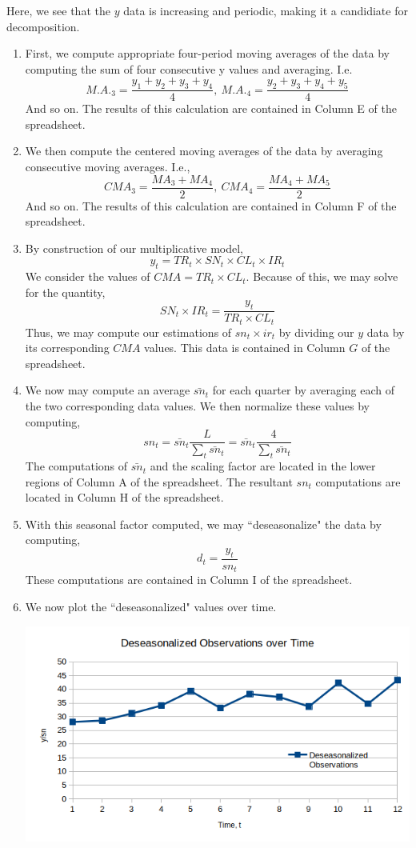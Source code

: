 \documentclass[letterpaper,10pt]{article}
\begin{document}
\begin{enumerate}
\begin{center}
\end{center}
Here, we see that the $y$ data is increasing and periodic, making it a candidiate for decomposition.
\begin{enumerate}
\item First, we compute appropriate four-period moving averages of the data by computing the sum of four consecutive y values and averaging. I.e.
\[M.A._3=\frac{y_1+y_2+y_3+y_4}{4},\ M.A._4=\frac{y_2+y_3+y_4+y_5}{4}\]
And so on. The results of this calculation are contained in Column E of the spreadsheet.
\item We then compute the centered moving averages of the data by averaging consecutive moving averages. I.e.,
\[CMA_3=\frac{MA_3+MA_4}{2},\ CMA_4=\frac{MA_4+MA_5}{2}\]
And so on. The results of this calculation are contained in Column F of the spreadsheet.
\item By construction of our multiplicative model,
\[y_t=TR_t\times SN_t\times CL_t\times IR_t\]
We consider the values of $CMA=TR_t\times CL_t$. Because of this, we may solve for the quantity,
\[SN_t\times IR_t = \frac{y_t}{TR_t\times CL_t}\]
Thus, we may compute our estimations of $sn_t\times ir_t$ by dividing our $y$ data by its corresponding $CMA$ values. This data is contained in Column $G$ of the spreadsheet.
\item We now may compute an average $\bar{sn}_t$ for each quarter by averaging each of the two corresponding data values. We then normalize these values by computing,
\[sn_t=\bar{sn}_t \frac{L}{\sum_t \bar{sn}_t}=\bar{sn}_t \frac{4}{\sum_t \bar{sn}_t}\]
The computations of $\bar{sn}_t$ and the scaling factor are located in the lower regions of Column A of the spreadsheet. The resultant $sn_t$ computations are located in Column H of the spreadsheet.
\item With this seasonal factor computed, we may ``deseasonalize" the data by computing,
\[d_t=\frac{y_t}{sn_t}\]
These computations are contained in Column I of the spreadsheet.
\item We now plot the ``deseasonalized" values over time.
\begin{center}
\includegraphics[scale=.8]{deseasonalizedmult.png}

\end{center}
\end{enumerate}
\end{enumerate}
\end{document}
